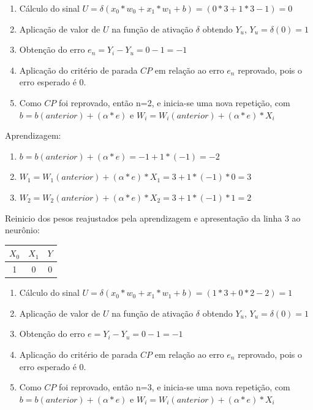 \documentclass[	12pt, Times, openright, twoside, a4paper, english, brazil]{abntex2}
\begin{document}
  				
  				\begin{enumerate}
  					\item Cálculo do sinal $U = \delta(x_0*w_0 + x_1*w_1 +b) = (0*3 + 1*3 -1) = 0$
  					\item Aplicação de valor de $U$ na função de ativação $\delta$ obtendo $Y_u$, $Y_u = \delta(0) = 1$
  					\item Obtenção do erro $e_n = Y_i-Y_u = 0 - 1 = -1$
  					\item Aplicação do critério de parada $CP$ em relação ao erro $e_n$ reprovado, pois o erro esperado é 0.
  					\item Como $CP$ foi reprovado, então n=2, e inicia-se uma nova repetição, com $b=b(anterior)+(\alpha*e)$ e $W_i=W_i(anterior) + (\alpha*e)*X_i$
  				\end{enumerate}
  				
  				Aprendizagem:
  				\begin{enumerate}
  					\item $b=b(anterior)+(\alpha*e) = -1 + 1*(-1) = -2 $  					
  					\item $W_1=W_1(anterior) + (\alpha*e)*X_1 = 3 + 1*(-1)*0 = 3$ 
  					\item $W_2=W_2(anterior) + (\alpha*e)*X_2 = 3 + 1*(-1)*1 = 2$
  				\end{enumerate}	
  				
  				Reinicio dos pesos reajustados pela aprendizagem e apresentação da linha 3 ao neurônio:
  				
  				\begin{tabular}{|c|c|c|}
  					\hline  \textbf{$X_0$} & \textbf{$X_1$} &  \textbf{$Y$}\\
  					\hline 1 & 0 & 0\\
  				\end{tabular}
            	
            	
            	\begin{enumerate}
            		\item Cálculo do sinal $U = \delta(x_0*w_0 + x_1*w_1 +b) = (1*3 + 0*2 -2) = 1$
            		\item Aplicação de valor de $U$ na função de ativação $\delta$ obtendo $Y_u$, $Y_u = \delta(0) = 1$
            		\item Obtenção do erro $e = Y_i-Y_u = 0 - 1 = -1$
            		\item Aplicação do critério de parada $CP$ em relação ao erro $e_n$ reprovado, pois o erro esperado é 0.
            		\item Como $CP$ foi reprovado, então n=3, e inicia-se uma nova repetição, com $b=b(anterior)+(\alpha*e)$ e $W_i=W_i(anterior) + (\alpha*e)*X_i$
            	\end{enumerate}
            
\end{document}
